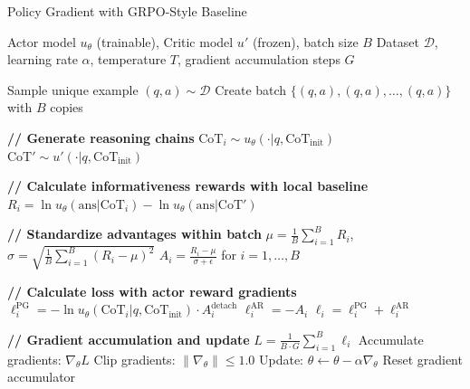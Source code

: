 \documentclass[letterpaper]{article} %
\begin{document}
\begin{algorithm}
\caption{Policy Gradient with GRPO-Style Baseline}
\label{alg:grpo}
\begin{algorithmic}[1]
\REQUIRE Actor model $u_\theta$ (trainable), Critic model $u'$ (frozen), batch size $B$
\REQUIRE Dataset $\mathcal{D}$, learning rate $\alpha$, temperature $T$, gradient accumulation steps $G$

    \STATE Sample unique example $(q, a) \sim \mathcal{D}$
    \STATE Create batch $\{(q, a), (q, a), \ldots, (q, a)\}$ with $B$ copies
    
    \STATE \textbf{// Generate reasoning chains}
        \STATE $\text{CoT}_i \sim u_\theta(\cdot | q, \text{CoT}_{\text{init}})$ 
    \ENDFOR
    \STATE $\text{CoT}' \sim u'(\cdot | q, \text{CoT}_{\text{init}})$ 
    
    \STATE \textbf{// Calculate informativeness rewards with local baseline}
        \STATE $R_i = \ln u_\theta(\text{ans} | \text{CoT}_i) - \ln u_\theta(\text{ans} | \text{CoT}')$
    \ENDFOR
    
    \STATE \textbf{// Standardize advantages within batch}
    \STATE $\mu = \frac{1}{B} \sum_{i=1}^B R_i$, \quad $\sigma = \sqrt{\frac{1}{B} \sum_{i=1}^B (R_i - \mu)^2}$
    \STATE $A_i = \frac{R_i - \mu}{\sigma + \epsilon}$ for $i = 1, \ldots, B$ 
    
    \STATE \textbf{// Calculate loss with actor reward gradients}
        \STATE $\ell_i^{\text{PG}} = -\ln u_\theta(\text{CoT}_i | q, \text{CoT}_{\text{init}}) \cdot A_i^{\text{detach}}$
        \STATE $\ell_i^{\text{AR}} = -A_i$ 
        \STATE $\ell_i = \ell_i^{\text{PG}} + \ell_i^{\text{AR}}$
    \ENDFOR
    
    \STATE \textbf{// Gradient accumulation and update}
    \STATE $L = \frac{1}{B \cdot G} \sum_{i=1}^B \ell_i$ 
    \STATE Accumulate gradients: $\nabla_\theta L$
        \STATE Clip gradients: $\|\nabla_\theta\| \leq 1.0$
        \STATE Update: $\theta \leftarrow \theta - \alpha \nabla_\theta$
        \STATE Reset gradient accumulator
    \ENDIF
\ENDFOR
\end{algorithmic}
\end{algorithm}
\end{document}
